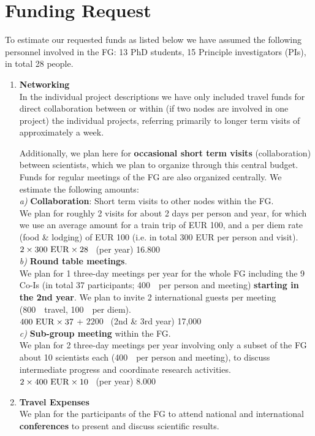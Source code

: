 \section{Funding Request}
%
To estimate our requested funds as listed below we have assumed the following 
personnel involved in the FG: 13 PhD students, 15 Principle investigators (PIs),
in total 28 people.
%
\begin{enumerate}
\item {\bf Networking} \\
In the individual project descriptions we have only included travel funds for
direct collaboration between or within (if two nodes are involved in one
project) the individual projects, referring primarily to longer term visits
of approximately a week.

Additionally, we plan here for {\bf occasional short term visits} (collaboration) between
scientists, which we plan to organize through this central budget. Funds for regular
meetings of the FG are also organized centrally. We estimate the following amounts:
\\[0.1cm]
 {\it a)} {\bf Collaboration}: Short term visits to other nodes within the FG. \\ 
 We plan for roughly 2 visits for about 2 days per person and year, for which we use
  an average amount for a train trip of EUR 100, and a per diem rate (food \& lodging)
  of EUR 100 (i.e. in total 300 EUR per person and visit).
\\[0.1cm]
\noindent
 $ 2 \times 300~\mathrm{EUR} \times 28  $  \, (per year)     \hfill 16.800~\EUR
\\[0.2cm]
\newpage
 {\it b)}  {\bf Round table meetings}. \\ 
 We plan for 1 three-day meetings per year for the whole FG including 
 the 9 Co-Is (in total 37 participants; 400~\EUR\ per person and meeting) 
  {\bf starting in the 2nd year}.
We plan to invite 
 2 international guests per meeting (800~\EUR\ travel, 100~\EUR\ per diem). 
\\[0.1cm]
 $ 400~\mathrm{EUR} \times 37  $  +  $2200$ \EUR \,  (2nd \& 3rd year)  \hfill 17,000~\EUR
\\[0.2cm]
 {\it c)}  {\bf Sub-group meeting} within the FG. \\
 We plan for 2 three-day meetings per year involving only a subset of the FG
 about 10 scientists each  (400~\EUR\ per person and meeting),
 to discuss intermediate progress and coordinate research activities.
\\[0.1cm]
 $ 2 \times 400~\mathrm{EUR} \times 10  $  \,  (per year)                \hfill  8.000~\EUR
\\[0.2cm]
%
%
\item {\bf Travel Expenses}\\
We plan for the participants of the FG to 
attend national and international {\bf conferences} to present and discuss
scientific results.


\end{enumerate}
